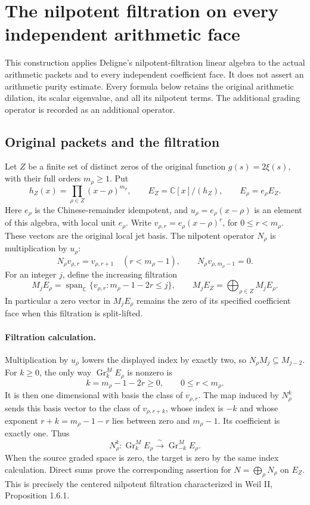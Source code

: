 \section{The nilpotent filtration on every independent arithmetic face}
\label{CFStage:sec:mixed-face-monodromy}

This construction applies Deligne's nilpotent-filtration linear algebra to the
actual arithmetic packets and to every independent coefficient face. It does
not assert an arithmetic purity estimate. Every formula below retains the
original arithmetic dilation, its scalar eigenvalue, and all its nilpotent
terms. The additional grading operator is recorded as an additional operator.

\subsection{Original packets and the filtration}

Let \(Z\) be a finite set of distinct zeros of the original function
\(g(s)=2\xi(s)\), with their full orders \(m_\rho\geq1\). Put
\[
 h_Z(x)=\prod_{\rho\in Z}(x-\rho)^{m_\rho},\qquad
 E_Z=\mathbb C[x]/(h_Z),\qquad
 E_\rho=e_\rho E_Z.
 \tag{MW1}
\]
Here \(e_\rho\) is the Chinese-remainder idempotent, and
\(u_\rho=e_\rho(x-\rho)\) is an element of this algebra, with local unit
\(e_\rho\). Write \(v_{\rho,r}=e_\rho(x-\rho)^r\), for
\(0\leq r<m_\rho\). These vectors are the original local jet basis.
The nilpotent operator \(N_\rho\) is multiplication by \(u_\rho\):
\[
 N_\rho v_{\rho,r}=v_{\rho,r+1}\quad(r<m_\rho-1),\qquad
 N_\rho v_{\rho,m_\rho-1}=0.
 \tag{MW2}
\]
For an integer \(j\), define the increasing filtration
\[
 M_jE_\rho
 =\operatorname{span}_{\mathbb C}
   \{v_{\rho,r}:m_\rho-1-2r\leq j\},\qquad
 M_jE_Z=\bigoplus_{\rho\in Z}M_jE_\rho .
 \tag{MW3}
\]
In particular a zero vector in \(M_jE_\rho\) remains the zero of its specified
coefficient face when this filtration is split-lifted.

\paragraph{Filtration calculation.}
Multiplication by \(u_\rho\) lowers the displayed index by exactly two,
so \(N_\rho M_j\subseteq M_{j-2}\). For \(k\geq0\), the only way
\(\operatorname{Gr}_k^M E_\rho\) is nonzero is
\[
 k=m_\rho-1-2r\geq0,\qquad 0\leq r<m_\rho .
\]
It is then one dimensional with basis the class of \(v_{\rho,r}\).
The map induced by \(N_\rho^k\) sends this basis vector to the class of
\(v_{\rho,r+k}\), whose index is \(-k\) and whose exponent
\(r+k=m_\rho-1-r\) lies between zero and \(m_\rho-1\).
Its coefficient is exactly one. Thus
\[
 N_\rho^k:\operatorname{Gr}_k^M E_\rho
       \xrightarrow{\;\sim\;}\operatorname{Gr}_{-k}^M E_\rho .
 \tag{MW4}
\]
When the source graded space is zero, the target is zero by the same
index calculation. Direct sums prove the corresponding assertion for
\(N=\bigoplus_\rho N_\rho\) on \(E_Z\).
This is precisely the centered nilpotent filtration characterized in
Weil II, Proposition 1.6.1.

